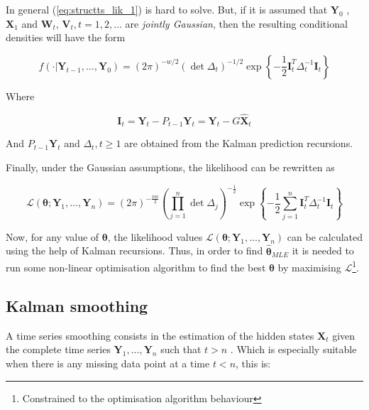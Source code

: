 In general (\ref{eq:structts_lik_1}) is hard to solve. But, if it is assumed that $\bm{Y}_0$ , $\bm{X}_1$ and $\bm{W}_t$, $\bm{V}_t, t=1,2,\ldots$ are \emph{jointly Gaussian}, then the resulting conditional densities will have the form \cite{brockwell2016introduction}

\begin{equation}
	f(\cdot | \bm{Y}_{t-1}, \ldots, \bm{Y}_0) =  \left(2 \pi\right)^{-w/2} \left(\det \Delta_t\right)^{-1/2} \exp \left\{-\frac{1}{2} \bm{I}_t^T \Delta_t^{-1}\bm{I}_t\right\}
\end{equation}

Where 

\begin{equation}
	\bm{I}_t = \bm{Y}_t - P_{t-1} \bm{Y}_t = \bm{Y}_t - G \hat{\bm{X}}_t
\end{equation}

And $P_{t-1} \bm{Y}_t$ and $\Delta_t, t \geq 1$ are obtained from the Kalman prediction recursions.

Finally, under the Gaussian assumptions, the likelihood can be rewritten as \cite{brockwell2016introduction}

\begin{equation}\label{eq:structts_lik_2}
	\mathcal{L}(\bm{\theta} ; \bm{Y}_1, \ldots, \bm{Y}_n) =
	\left(2 \pi\right)^{-\frac{nw}{2}} 
	\left( \prod_{j=1}^{n}{\det \Delta_j} \right)^{-\frac{1}{2}}
	\exp\left\{ - \frac{1}{2} \sum_{j=1}^{n}{\bm{I}_t^T \Delta_t^{-1}\bm{I}_t} \right\}
\end{equation} 

Now, for any value of $\bm{\theta}$, the likelihood values $\mathcal{L}(\bm{\theta} ; \bm{Y}_1, \ldots, \bm{Y}_n)$ can be calculated using the help of Kalman recursions. Thus, in order to find $\hat{\bm{\theta}}_{MLE}$ it is needed to run some non-linear optimisation algorithm to find the best $\bm{\theta}$ by maximising $\mathcal{L}$\footnote{Constrained to the optimisation algorithm behaviour}. %

\subsection{Kalman smoothing}

A time series smoothing consists in the estimation of the hidden states $\bm{X}_t$ given the complete time series $\bm{Y}_1, \ldots, \bm{Y}_n$ such that $t > n$ \cite{timeseries_statespace_models}. Which is especially suitable when there is any missing data point at a time $t < n$, this is:

